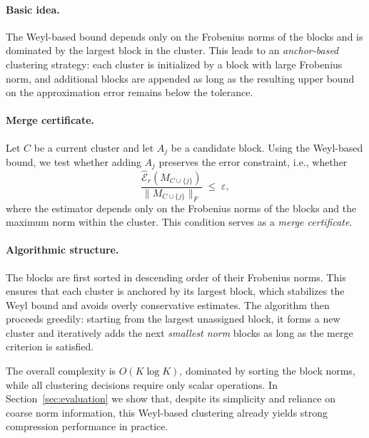 \documentclass[10pt]{article} %
\begin{document}
\paragraph{Basic idea.}
The Weyl-based bound depends only on the Frobenius norms of the blocks and is
dominated by the largest block in the cluster. This leads to an
\emph{anchor-based} clustering strategy: each cluster is initialized by a block
with large Frobenius norm, and additional blocks are appended as long as the
resulting upper bound on the approximation error remains below the tolerance.

\paragraph{Merge certificate.}
Let $C$ be a current cluster and let $A_j$ be a candidate block. Using the
Weyl-based bound, we test whether adding $A_j$ preserves the error constraint,
i.e., whether
\[
  \frac{\widehat{\mathcal{E}}_r(M_{C\cup\{j\}})}{\|M_{C\cup\{j\}}\|_F}
  \;\le\; \varepsilon,
\]
where the estimator depends only on the Frobenius norms of the blocks and the
maximum norm within the cluster. This condition serves as a \emph{merge
certificate}.

\paragraph{Algorithmic structure.}
The blocks are first sorted in descending order of their Frobenius norms. This
ensures that each cluster is anchored by its largest block, which stabilizes
the Weyl bound and avoids overly conservative estimates. The algorithm then
proceeds greedily: starting from the largest unassigned block, it forms a new
cluster and iteratively adds the next \emph{smallest norm} blocks as long as the
merge criterion is satisfied.

The overall complexity is $O(K\log K)$, dominated by sorting the block norms,
while all clustering decisions require only scalar operations. In
Section~\ref{sec:evaluation} we show that, despite its simplicity and reliance
on coarse norm information, this Weyl-based clustering already yields strong
compression performance in practice.
\end{document}
